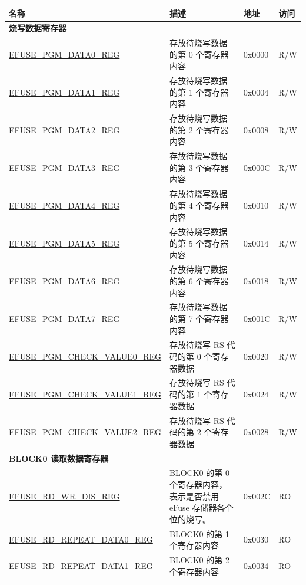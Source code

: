 \begin{longtable}{ | p{7cm} | p{7.2cm} | p{1.3cm} | p{1cm} | }
\hline\rowcolor{lightgray}
名称 & 描述 &  地址 & 访问 \\ \hline
\endhead
\multicolumn{4}{|l|}{\textbf{烧写数据寄存器}} \\ \hline
\hyperref[regdesc:EFUSEPGMDATANREG]{EFUSE\_PGM\_DATA0\_REG} & 存放待烧写数据的第 0 个寄存器内容 & 0x0000 & R/W \\ \hline
\hyperref[regdesc:EFUSEPGMDATANREG]{EFUSE\_PGM\_DATA1\_REG} & 存放待烧写数据的第 1 个寄存器内容 & 0x0004 & R/W \\ \hline
\hyperref[regdesc:EFUSEPGMDATANREG]{EFUSE\_PGM\_DATA2\_REG} & 存放待烧写数据的第 2 个寄存器内容 & 0x0008 & R/W \\ \hline
\hyperref[regdesc:EFUSEPGMDATANREG]{EFUSE\_PGM\_DATA3\_REG} & 存放待烧写数据的第 3 个寄存器内容 & 0x000C & R/W \\ \hline
\hyperref[regdesc:EFUSEPGMDATANREG]{EFUSE\_PGM\_DATA4\_REG} & 存放待烧写数据的第 4 个寄存器内容 & 0x0010 & R/W \\ \hline
\hyperref[regdesc:EFUSEPGMDATANREG]{EFUSE\_PGM\_DATA5\_REG} & 存放待烧写数据的第 5 个寄存器内容 & 0x0014 & R/W \\ \hline
\hyperref[regdesc:EFUSEPGMDATANREG]{EFUSE\_PGM\_DATA6\_REG} & 存放待烧写数据的第 6 个寄存器内容 & 0x0018 & R/W \\ \hline
\hyperref[regdesc:EFUSEPGMDATANREG]{EFUSE\_PGM\_DATA7\_REG} & 存放待烧写数据的第 7 个寄存器内容 & 0x001C & R/W \\ \hline
\hyperref[regdesc:EFUSEPGMCHECKVALUENREG]{EFUSE\_PGM\_CHECK\_VALUE0\_REG} & 存放待烧写 RS 代码的第 0 个寄存器数据 & 0x0020 & R/W \\ \hline
\hyperref[regdesc:EFUSEPGMCHECKVALUENREG]{EFUSE\_PGM\_CHECK\_VALUE1\_REG} & 存放待烧写 RS 代码的第 1 个寄存器数据 & 0x0024 & R/W \\ \hline
\hyperref[regdesc:EFUSEPGMCHECKVALUENREG]{EFUSE\_PGM\_CHECK\_VALUE2\_REG} & 存放待烧写 RS 代码的第 2 个寄存器数据 & 0x0028 & R/W \\ \hline
\multicolumn{4}{|l|}{\textbf{BLOCK0 读取数据寄存器}} \\ \hline
\hyperref[regdesc:EFUSERDWRDISREG]{EFUSE\_RD\_WR\_DIS\_REG} & BLOCK0 的第 0 个寄存器内容，表示是否禁用 eFuse 存储器各个位的烧写。& 0x002C & RO \\ \hline
\hyperref[regdesc:EFUSERDREPEATDATA0REG]{EFUSE\_RD\_REPEAT\_DATA0\_REG} & BLOCK0 的第 1 个寄存器内容 & 0x0030 & RO \\ \hline
\hyperref[regdesc:EFUSERDREPEATDATA1REG]{EFUSE\_RD\_REPEAT\_DATA1\_REG} & BLOCK0 的第 2 个寄存器内容 & 0x0034 & RO \\ \hline

\end{longtable}
